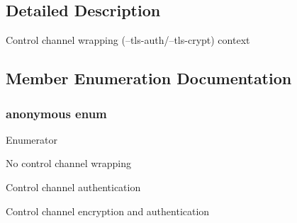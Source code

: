 \subsection{Detailed Description}
Control channel wrapping (--tls-\/auth/--tls-\/crypt) context 

\subsection{Member Enumeration Documentation}
\hypertarget{structtls__wrap__ctx_a208cb4dc29cba3a00bb6a898eae2403e}{}\subsubsection[{anonymous enum}]{\setlength{\rightskip}{0pt plus 5cm}anonymous enum}\label{structtls__wrap__ctx_a208cb4dc29cba3a00bb6a898eae2403e}
\begin{Desc}
\item[Enumerator]\par
\begin{description}
\item[{\em 
\hypertarget{structtls__wrap__ctx_a208cb4dc29cba3a00bb6a898eae2403ea7c681db449b599faa6757c538f32fcee}{}T\+L\+S\+\_\+\+W\+R\+A\+P\+\_\+\+N\+O\+N\+E\label{structtls__wrap__ctx_a208cb4dc29cba3a00bb6a898eae2403ea7c681db449b599faa6757c538f32fcee}
}]No control channel wrapping \item[{\em 
\hypertarget{structtls__wrap__ctx_a208cb4dc29cba3a00bb6a898eae2403ead22a5947e6b2fa7f8e5cac9bf2703a18}{}T\+L\+S\+\_\+\+W\+R\+A\+P\+\_\+\+A\+U\+T\+H\label{structtls__wrap__ctx_a208cb4dc29cba3a00bb6a898eae2403ead22a5947e6b2fa7f8e5cac9bf2703a18}
}]Control channel authentication \item[{\em 
\hypertarget{structtls__wrap__ctx_a208cb4dc29cba3a00bb6a898eae2403ea54693b0aabdf162f098f390a6646040b}{}T\+L\+S\+\_\+\+W\+R\+A\+P\+\_\+\+C\+R\+Y\+P\+T\label{structtls__wrap__ctx_a208cb4dc29cba3a00bb6a898eae2403ea54693b0aabdf162f098f390a6646040b}
}]Control channel encryption and authentication \end{description}
\end{Desc}


